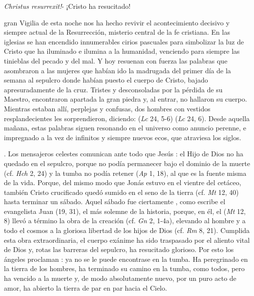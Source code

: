 \begin{body}
\textit{Christus resurrexit!}- ¡Cristo ha resucitado! 

 gran Vigilia de esta noche nos ha hecho revivir el acontecimiento decisivo y siempre actual de la Resurrección, misterio central de la fe cristiana. En las iglesias se han encendido innumerables cirios pascuales para simbolizar la luz de Cristo que ha iluminado e ilumina a la humanidad, venciendo para siempre las tinieblas del pecado y del mal. Y hoy resuenan con fuerza las palabras que asombraron a las mujeres que habían ido la madrugada del primer día de la semana al sepulcro donde habían puesto el cuerpo de Cristo, bajado apresuradamente de la cruz. Tristes y desconsoladas por la pérdida de su Maestro, encontraron apartada la gran piedra y, al entrar, no hallaron su cuerpo. Mientras estaban allí, perplejas y confusas, dos hombres con vestidos resplandecientes les sorprendieron, diciendo:  (\textit{Lc} 24, 5-6)  (\textit{Lc} 24, 6). Desde aquella mañana, estas palabras siguen resonando en el universo como anuncio perenne, e impregnado a la vez de infinitos y siempre nuevos ecos, que atraviesa los siglos. 

. Los mensajeros celestes comunican ante todo que Jesús : el Hijo de Dios no ha quedado en el sepulcro, porque no podía permanecer bajo el dominio de la muerte (cf. \textit{Hch} 2, 24) y la tumba no podía retener  (\textit{Ap} 1, 18), al que es la fuente misma de la vida. Porque, del mismo modo que Jonás estuvo en el vientre del cetáceo, también Cristo crucificado quedó sumido en el seno de la tierra (cf. \textit{Mt} 12, 40) hasta terminar un sábado. Aquel sábado fue ciertamente , como escribe el evangelista Juan (19, 31), el más solemne de la historia, porque, en él, el  (\textit{Mt} 12, 8) llevó a término la obra de la creación (cf. \textit{Gn} 2, 1-4a), elevando al hombre y a todo el cosmos a la gloriosa libertad de los hijos de Dios (cf. \textit{Rm} 8, 21). Cumplida esta obra extraordinaria, el cuerpo exánime ha sido traspasado por el aliento vital de Dios y, rotas las barreras del sepulcro, ha resucitado glorioso. Por esto los ángeles proclaman : ya no se le puede encontrase en la tumba. Ha peregrinado en la tierra de los hombres, ha terminado su camino en la tumba, como todos, pero ha vencido a la muerte y, de modo absolutamente nuevo, por un puro acto de amor, ha abierto la tierra de par en par hacia el Cielo. 


\end{body}
